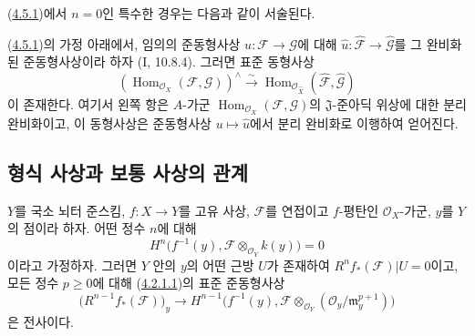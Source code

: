 (\hyperref[III.4.5.1-fr]{4.5.1})에서 $n=0$인 특수한 경우는 다음과
같이 서술된다.

\begin{corollary}[4.5.3]
\label{III.4.5.3-fr}
(\hyperref[III.4.5.1-fr]{4.5.1})의 가정 아래에서, 임의의 준동형사상
$u:\mathcal F\to\mathcal G$에 대해 $\widehat u:\widehat{\mathcal F}
\to\widehat{\mathcal G}$를 그 완비화된 준동형사상이라 하자
(I, 10.8.4). 그러면 표준 동형사상
\[
\label{III.4.5.3.1-fr}
\left(\operatorname{Hom}_{\mathcal O_X}(\mathcal F,\mathcal G)\right)^\wedge
\xrightarrow{\sim}
\operatorname{Hom}_{\mathcal O_{\widehat X}}
(\widehat{\mathcal F},\widehat{\mathcal G})
\tag{4.5.3.1}
\]
이 존재한다. 여기서 왼쪽 항은 $A$-가군
$\operatorname{Hom}_{\mathcal O_X}(\mathcal F,\mathcal G)$의
$\mathfrak J$-준아딕 위상에 대한 분리 완비화이고, 이 동형사상은
준동형사상 $u\mapsto\widehat u$에서 분리 완비화로 이행하여 얻어진다.
\end{corollary}

\subsection{형식 사상과 보통 사상의 관계}

\begin{proposition}[4.6.1]
\label{III.4.6.1-fr}
$Y$를 국소 뇌터 준스킴, $f:X\to Y$를 고유 사상,
$\mathcal F$를 연접이고 $f$-평탄인 $\mathcal O_X$-가군, $y$를
$Y$의 점이라 하자. 어떤 정수 $n$에 대해
\[
H^n\bigl(f^{-1}(y),\mathcal F\otimes_{\mathcal O_Y}k(y)\bigr)=0
\]
이라고 가정하자. 그러면 $Y$ 안의 $y$의 어떤 근방 $U$가 존재하여
$R^nf_*(\mathcal F)|U=0$이고, 모든 정수 $p\geq0$에 대해
(\hyperref[III.4.2.1.1-fr]{4.2.1.1})의 표준 준동형사상
\[
\bigl(R^{n-1}f_*(\mathcal F)\bigr)_y
\longrightarrow
H^{n-1}\bigl(f^{-1}(y),
\mathcal F\otimes_{\mathcal O_Y}
(\mathcal O_y/\mathfrak m_y^{p+1})\bigr)
\]
은 전사이다.
\end{proposition}

